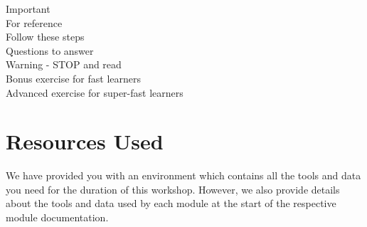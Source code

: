 \hspace*{.2cm} Important\\
\hspace*{.2cm} For reference\\
\hspace*{.2cm} Follow these steps\\
\hspace*{.2cm} Questions to answer\\
\hspace*{.2cm} Warning - STOP and read\\
\hspace*{.2cm} Bonus exercise for fast learners\\
\hspace*{.2cm} Advanced exercise for super-fast learners\\

\section{Resources Used}
We have provided you with an environment which contains all the tools and data
you need for the duration of this workshop. However, we also provide details
about the tools and data used by each module at the start of the respective
module documentation.

